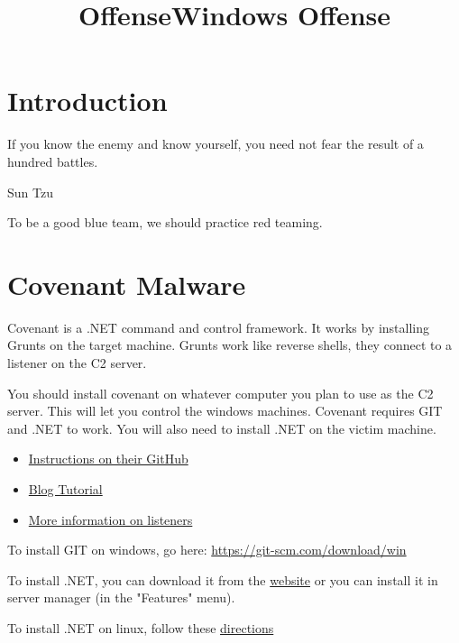 \documentclass{article}
\title{Offense}
\begin{document}
\maketitle

\graphicspath{ {./Images/} }

\title{Windows Offense}

\tableofcontents

\section{Introduction}
\epigraph{If you know the enemy and know yourself, you need not fear the result of a hundred battles.}{Sun Tzu}

To be a good blue team, we should practice red teaming.

\section{Covenant Malware}
Covenant is a .NET command and control framework. It works by installing
Grunts on the target machine. Grunts work like reverse shells, they connect to a listener on 
the C2 server.

You should install covenant on whatever computer you
plan to use as the C2 server. This will let you control the windows machines. 
Covenant requires GIT and .NET to work. 
You will also need to install .NET on the victim machine.

\begin{itemize}
        \item\href{https://github.com/cobbr/Covenant/wiki/Installation-And-Startup}{Instructions on their GitHub}
        \item \href{https://blog.netwrix.com/2022/12/16/covenant-c2-tutorial/}{Blog Tutorial}
        \item \href{https://github.com/cobbr/Covenant-wiki/blob/master/Listeners.md}{More information on listeners}
\end{itemize}

To install GIT on windows, go here:
\href{https://git-scm.com/download/win}{https://git-scm.com/download/win}

To install .NET, you can download it from the
\href{https://dotnet.microsoft.com/en-us/download}{website} or you can install it in server manager (in the "Features" menu).

To install .NET on linux, follow these 
\href{https://learn.microsoft.com/en-us/dotnet/core/install/linux-scripted-manual#scripted-install}{directions}
\end{document}
